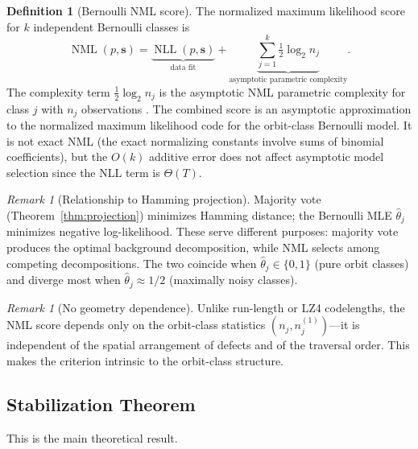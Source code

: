 \documentclass[11pt]{article}
\theoremstyle{definition}
\newtheorem{definition}[theorem]{Definition}
\theoremstyle{remark}
\newtheorem{remark}[theorem]{Remark}
\newcommand{\bs}{\mathbf{s}}
\newcommand{\NML}{\operatorname{NML}}
\newcommand{\NLL}{\operatorname{NLL}}
\begin{document}
\begin{definition}[Bernoulli NML score]\label{def:nml}
The normalized maximum likelihood score for $k$ independent Bernoulli classes is
\[
\NML(p, \bs) = \underbrace{\NLL(p, \bs)}_{\text{data fit}} + \underbrace{\sum_{j=1}^{k} \tfrac{1}{2} \log_2 n_j}_{\text{asymptotic parametric complexity}}.
\]
The complexity term $\frac{1}{2} \log_2 n_j$ is the asymptotic NML parametric complexity for class $j$ with $n_j$ observations \cite{grunwald2007}.
The combined score is an asymptotic approximation to the normalized maximum likelihood code for the orbit-class Bernoulli model.
It is not exact NML (the exact normalizing constants involve sums of binomial coefficients), but the $O(k)$ additive error does not affect asymptotic model selection since the NLL term is $\Theta(T)$.
\end{definition}

\begin{remark}[Relationship to Hamming projection]
Majority vote (Theorem~\ref{thm:projection}) minimizes Hamming distance; the Bernoulli MLE $\hat{\theta}_j$ minimizes negative log-likelihood.
These serve different purposes: majority vote produces the optimal background decomposition, while NML selects among competing decompositions.
The two coincide when $\hat{\theta}_j \in \{0, 1\}$ (pure orbit classes) and diverge most when $\hat{\theta}_j \approx 1/2$ (maximally noisy classes).
\end{remark}

\begin{remark}[No geometry dependence]
Unlike run-length or LZ4 codelengths, the NML score depends only on the orbit-class statistics $(n_j, n_j^{(1)})$---it is independent of the spatial arrangement of defects and of the traversal order.
This makes the criterion intrinsic to the orbit-class structure.
\end{remark}

\subsection{Stabilization Theorem}

This is the main theoretical result.
\end{document}
